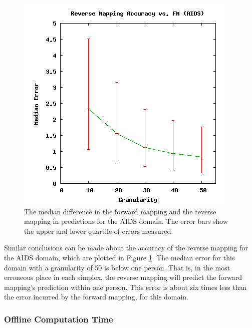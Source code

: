 \begin{figure}[ht]
\centering
\includegraphics[scale=.5]{images/results_aids/aids-rmacc.png}
\caption{The median difference in the forward mapping and the reverse mapping in predictions for the AIDS domain.
The error bars show the upper and lower quartile of errors measured.}
\label{fig:aidsrmacc}
\end{figure}

Similar conclusions can be made about the accuracy of the reverse mapping for the AIDS domain, which are plotted in Figure \ref{fig:aidsrmacc}.
The median error for this domain with a granularity of 50 is below one person.
That is, in the most erroneous place in each simplex, the reverse mapping will predict the forward mapping's prediction within one person.
This error is about six times less than the error incurred by the forward mapping, for this domain.



  \subsubsection{Offline Computation Time}

